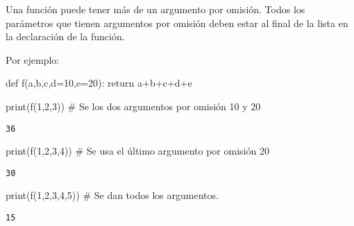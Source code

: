 \documentclass[
  letterpaper,
  DIV=11,
  numbers=noendperiod]{scrreprt}
\newenvironment{Shaded}{\begin{snugshade}}{\end{snugshade}}
\newcommand{\BuiltInTok}[1]{\textcolor[rgb]{0.00,0.23,0.31}{#1}}
\newcommand{\CommentTok}[1]{\textcolor[rgb]{0.37,0.37,0.37}{#1}}
\newcommand{\ControlFlowTok}[1]{\textcolor[rgb]{0.00,0.23,0.31}{#1}}
\newcommand{\DecValTok}[1]{\textcolor[rgb]{0.68,0.00,0.00}{#1}}
\newcommand{\KeywordTok}[1]{\textcolor[rgb]{0.00,0.23,0.31}{#1}}
\newcommand{\NormalTok}[1]{\textcolor[rgb]{0.00,0.23,0.31}{#1}}
\newcommand{\OperatorTok}[1]{\textcolor[rgb]{0.37,0.37,0.37}{#1}}
\begin{document}
Una función puede tener más de un argumento por omisión. Todos los
parámetros que tienen argumentos por omisión deben estar al final de la
lista en la declaración de la función.

Por ejemplo:

\begin{Shaded}
\begin{Highlighting}[]
\KeywordTok{def}\NormalTok{ f(a,b,c,d}\OperatorTok{=}\DecValTok{10}\NormalTok{,e}\OperatorTok{=}\DecValTok{20}\NormalTok{):}
    \ControlFlowTok{return}\NormalTok{ a}\OperatorTok{+}\NormalTok{b}\OperatorTok{+}\NormalTok{c}\OperatorTok{+}\NormalTok{d}\OperatorTok{+}\NormalTok{e}
\end{Highlighting}
\end{Shaded}

\begin{Shaded}
\begin{Highlighting}[]
\BuiltInTok{print}\NormalTok{(f(}\DecValTok{1}\NormalTok{,}\DecValTok{2}\NormalTok{,}\DecValTok{3}\NormalTok{))  }\CommentTok{\# Se los dos argumentos por omisión 10 y 20}
\end{Highlighting}
\end{Shaded}

\begin{verbatim}
36
\end{verbatim}

\begin{Shaded}
\begin{Highlighting}[]
\BuiltInTok{print}\NormalTok{(f(}\DecValTok{1}\NormalTok{,}\DecValTok{2}\NormalTok{,}\DecValTok{3}\NormalTok{,}\DecValTok{4}\NormalTok{)) }\CommentTok{\# Se usa el último argumento por omisión 20}
\end{Highlighting}
\end{Shaded}

\begin{verbatim}
30
\end{verbatim}

\begin{Shaded}
\begin{Highlighting}[]
\BuiltInTok{print}\NormalTok{(f(}\DecValTok{1}\NormalTok{,}\DecValTok{2}\NormalTok{,}\DecValTok{3}\NormalTok{,}\DecValTok{4}\NormalTok{,}\DecValTok{5}\NormalTok{)) }\CommentTok{\# Se dan todos los argumentos.}
\end{Highlighting}
\end{Shaded}

\begin{verbatim}
15
\end{verbatim}
\end{document}
